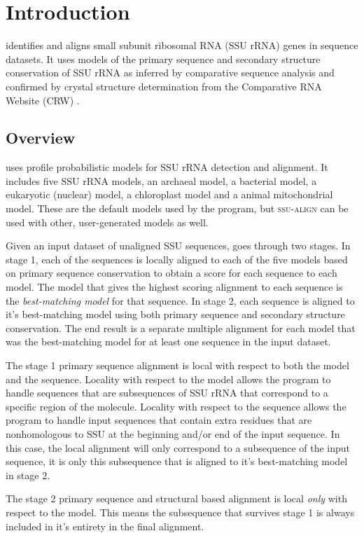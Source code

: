\section{Introduction}

 identifies and aligns small subunit ribosomal RNA
(SSU rRNA) genes in sequence datasets. It uses models of the primary
sequence and secondary structure conservation of SSU rRNA as inferred
by comparative sequence analysis and confirmed by crystal structure
determination from the Comparative RNA Website (CRW) \cite{Cannone02}.

\subsection{Overview}
 uses profile probabilistic models for SSU rRNA
detection and alignment. It includes five SSU rRNA models, an archaeal
model, a bacterial model, a eukaryotic (nuclear) model, a
chloroplast model and a animal mitochondrial model. These are the
default models used by the program, but \textsc{ssu-align} can be used
with other, user-generated models as well.

Given an input dataset of unaligned SSU sequences,
 goes through two stages. In stage 1, each of the
sequences is locally aligned to each of the five models based on
primary sequence conservation to obtain a score for each sequence to
each model.  The model that gives the highest scoring alignment to
each sequence is the \emph{best-matching model} for that sequence.  In
stage 2, each sequence is aligned to it's best-matching model using
both primary sequence and secondary structure conservation. The end
result is a separate multiple alignment for each model that was the
best-matching model for at least one sequence in the input dataset.

The stage 1 primary sequence alignment is local with respect to both
the model and the sequence. Locality with respect to the model allows
the program to handle sequences that are subsequences of SSU
rRNA that correspond to a specific region of the molecule. Locality
with respect to the sequence allows the program to handle input
sequences that contain extra residues that are nonhomologous to SSU at
the beginning and/or end of the input sequence. In this case, the
local alignment will only correspond to a subsequence of the input
sequence, it is only this subsequence that is aligned to it's
best-matching model in stage 2.

The stage 2 primary sequence and structural based alignment is local
\emph{only} with respect to the model.  This means the subsequence
that survives stage 1 is always included in it's entirety in the final
alignment.

